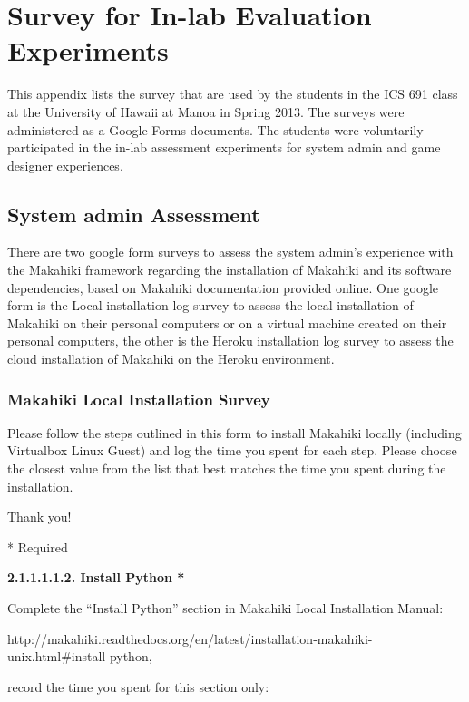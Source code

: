 \chapter{Survey for In-lab Evaluation Experiments}
\label{app:googleform}

This appendix lists the survey that are used by the students in the ICS 691 class at the University of Hawaii at Manoa in Spring 2013. The surveys were administered as a Google Forms documents. The students were voluntarily participated in the in-lab assessment experiments for system admin and game designer experiences.

\section{System admin Assessment}
\label{app:googleform-sysadmin}

There are two google form surveys to assess the system admin's experience with the Makahiki framework regarding the installation of Makahiki and its software dependencies, based on Makahiki documentation provided online. One google form is the Local installation log survey to assess the local installation of Makahiki on their personal computers or on a virtual machine created on their personal computers, the other is the Heroku installation log survey to assess the cloud installation of Makahiki on the Heroku environment.

\subsection{Makahiki Local Installation Survey}

\setlength{\parindent}{0pt}
\setlength{\parskip}{3mm}

Please follow the steps outlined in this form to install Makahiki locally (including Virtualbox Linux Guest) and log the time you spent for each step.
Please choose the closest value from the list that best matches the time you spent during the installation.

Thank you!

* Required

{\bf 2.1.1.1.1.2. Install Python *}

Complete the ``Install Python'' section in Makahiki Local Installation Manual:

http://makahiki.readthedocs.org/en/latest/installation-makahiki-unix.html\#install-python,

record the time you spent for this section only:

